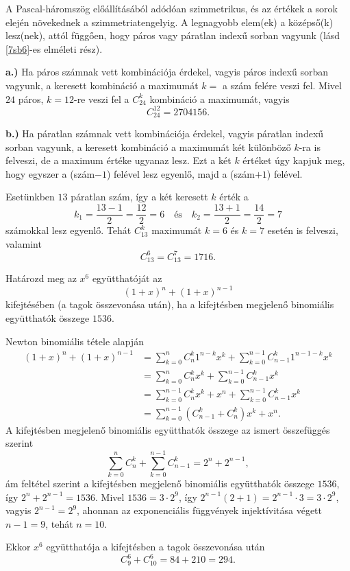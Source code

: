 \begin{solution}
A Pascal-háromszög előállításából adódóan szimmetrikus, és az értékek
a sorok elején növekednek a szimmetriatengelyig. A legnagyobb elem(ek)
a középső(k) lesz(nek), attól függően, hogy páros vagy páratlan indexű
sorban vagyunk (lásd \ref{7sb6}-es elméleti rész).

\textbf{a.)} Ha páros számnak vett kombinációja érdekel, vagyis páros
indexű sorban vagyunk, a keresett kombináció a maximumát $k=$ a szám
felére veszi fel. Mivel $24$ páros, $k=12$-re veszi fel a ${\displaystyle C_{24}^{k}}$
kombináció a maximumát, vagyis 
\[
C_{24}^{12}=2704156.
\]

\textbf{b.)} Ha páratlan számnak vett kombinációja érdekel, vagyis
páratlan indexű sorban vagyunk, a keresett kombináció a maximumát
két különböző $k$-ra is felveszi, de a maximum értéke ugyanaz lesz.
Ezt a két $k$ értéket úgy kapjuk meg, hogy egyszer a (szám$-1$)
felével lesz egyenlő, majd a (szám$+1$) felével.

Esetünkben $13$ páratlan szám, így a két keresett $k$ érték a 
\[
k_{1}=\frac{13-1}{2}=\frac{12}{2}=6\quad\text{és}\quad k_{2}=\frac{13+1}{2}=\frac{14}{2}=7
\]
számokkal lesz egyenlő. Tehát ${\displaystyle C_{13}^{k}}$ maximumát
$k=6$ és $k=7$ esetén is felveszi, valamint 
\[
C_{13}^{6}=C_{13}^{7}=1716.
\]
\end{solution}
\vspace{0.3cm}

\begin{problem}
Határozd meg az $x^{6}$ együtthatóját az 
\[
(1+x)^{n}+(1+x)^{n-1}
\]
kifejtésében (a tagok összevonása után), ha a kifejtésben megjelenő
binomiális együtthatók összege $1536.$
\end{problem}

\begin{solution}
Newton binomiális tétele alapján 
\begin{align*}
(1+x)^{n}+(1+x)^{n-1} & =\sum_{k=0}^{n}C_{n}^{k}1^{n-k}x^{k}+\sum_{k=0}^{n-1}C_{n-1}^{k}1^{n-1-k}x^{k}\\
 & =\sum_{k=0}^{n}C_{n}^{k}x^{k}+\sum_{k=0}^{n-1}C_{n-1}^{k}x^{k}\\
 & =\sum_{k=0}^{n-1}C_{n}^{k}x^{k}+x^{n}+\sum_{k=0}^{n-1}C_{n-1}^{k}x^{k}\\
 & =\sum_{k=0}^{n-1}(C_{n-1}^{k}+C_{n}^{k})x^{k}+x^{n}.
\end{align*}
A kifejtésben megjelenő binomiális együtthatók összege az ismert összefüggés
szerint 
\[
\sum_{k=0}^{n}C_{n}^{k}+\sum_{k=0}^{n-1}C_{n-1}^{k}=2^{n}+2^{n-1},
\]
ám feltétel szerint a kifejtésben megjelenő binomiális együtthatók
összege $1536$, így $2^{n}+2^{n-1}=1536.$ Mivel $1536=3\cdot2^{9}$,
így $2^{n-1}(2+1)=2^{n-1}\cdot3=3\cdot2^{9}$, vagyis $2^{n-1}=2^{9}$,
ahonnan az exponenciális függvények injektívitása végett $n-1=9$,
tehát $n=10.$

Ekkor $x^{6}$ együtthatója a kifejtésben a tagok összevonása után
\[
C_{9}^{6}+C_{10}^{6}=84+210=294.
\]
\end{solution}
\vspace{0.3cm}

